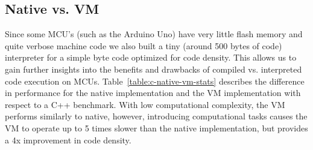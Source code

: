 


\subsection{\MC Native vs. \MC VM}

Since some MCU's (such as the Arduino Uno) have very little flash memory and quite 
verbose machine code we also built a tiny (around 500 bytes of code) interpreter 
for a simple byte code optimized for code density. This allows us to gain further insights into the 
benefits and drawbacks of compiled vs. interpreted code execution on MCUs.
Table~\ref{table:c-native-vm-stats} describes the difference in performance for the native implementation and the VM implementation with respect to a C++ benchmark. With low computational complexity, the VM performs similarly to native, however, introducing computational tasks causes the VM to operate up to 5 times slower than the native implementation, but provides a 4x improvement in code density.


